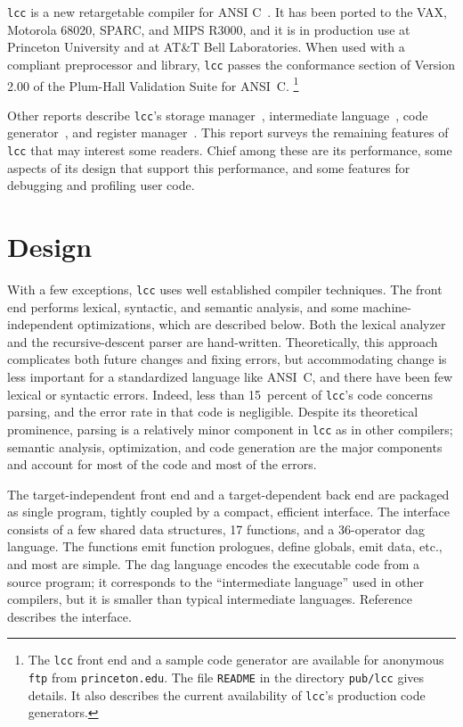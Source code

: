\verb|lcc| is a new retargetable compiler for ANSI C~\cite{ansi:Cstandard}.
It has been ported to the VAX, Motorola 68020, SPARC, and MIPS R3000,
and it is in production use at Princeton University
and at AT\&T Bell Laboratories.
When used with a compliant preprocessor and library,
\verb|lcc| passes the conformance section of
Version 2.00 of the Plum-Hall Validation Suite for ANSI~C.%
\footnote{The {\tt lcc} front end and a sample code generator are available
for anonymous {\tt ftp} from {\tt princeton.edu}.
The file {\tt README} in the directory {\tt pub/lcc} gives details.
It also describes the current availability of {\tt lcc}'s
production code generators.}

Other reports describe \verb|lcc|'s storage manager~\cite{hanson90},
intermediate language~\cite{fraser:hanson:91a}, code
generator~\cite{fraser:sigplan89}, and register
manager~\cite{fraser:hanson:92}.  This report surveys the
remaining features of \verb|lcc| that may interest some readers.  Chief
among these are its performance, some aspects of its design that
support this performance, and some features for debugging and profiling
user code.

\section{Design}

With a few exceptions, \verb|lcc| uses
well established compiler techniques.
The front end performs lexical, syntactic, and semantic analysis, and
some machine-independent optimizations, which are described below.
Both the lexical analyzer and the recursive-descent parser are hand-written.
Theoretically, this approach complicates both future changes and fixing errors,
but accommodating change is less important for a standardized language like ANSI~C,
and there have been few lexical or syntactic errors.
Indeed, less than 15~percent of \verb|lcc|'s code concerns parsing,
and the error rate in that code is negligible.
Despite its theoretical prominence,
parsing is a relatively minor component in \verb|lcc| as in other compilers;
semantic analysis, optimization, and code generation are the major components
and account for most of the code and most of the errors.

The target-independent front end and a target-dependent back end are
packaged as single program, tightly coupled by a
compact, efficient interface.
The interface consists of a few shared data structures,
17 functions, and a 36-operator dag language.
The functions emit function prologues,
define globals, emit data, etc., and most are simple.
The dag language encodes the executable code from a source program; it
corresponds to the ``intermediate language'' used in other compilers, but
it is smaller than typical intermediate languages.
Reference~\cite{fraser:hanson:91a} describes the interface.


